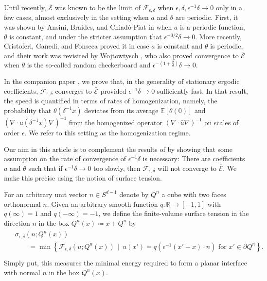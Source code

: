 \documentclass[10pt,a4paper]{amsart}
\begin{document}
Until recently, $\bar{\mathscr{E}}$ was known to be the limit of $\mathscr{F}_{\epsilon,\delta}$ when $\epsilon , \delta , \epsilon^{-1} \delta \to 0$ only in a few cases, almost exclusively in the setting when $a$ and $\theta$ are periodic.  First, it was shown by Ansini, Braides, and Chiad\`{o}-Piat in \cite{ansini_braides_chiado-piat} when $a$ is a periodic function, $\theta$ is constant, and under the stricter assumption that $\epsilon^{-3/2} \delta \to 0$.  More recently, Cristoferi, Ganedi, and Fonseca \cite{cristoferi_fonseca_ganedi_supercritical} proved it in case $a$ is constant and $\theta$ is periodic, and their work was revisited by Wojtowtysch \cite{wojtowytsch}, who also proved convergence to $ \bar{\mathscr{E}}$ when $\theta$ is the so-called random checkerboard and $ \epsilon^{ - ( 1 + \frac{ 2 }{ d } ) } \delta \to 0 $. 

In the companion paper \cite{part1}, we prove that, in the generality of stationary ergodic coefficients, $\mathscr{F}_{\epsilon,\delta}$ converges to $\bar{\mathscr{E}}$ provided $\epsilon^{-1} \delta \to 0$ sufficiently fast. In that result, the speed is quantified in terms of rates of homogenization, namely, the probability that $\theta(\delta^{-1} x)$ deviates from its average $\mathbb{E} [ \theta (0) ]$ and $( \nabla \cdot a(\delta^{-1} x) \nabla )^{-1}$ from the homogenized operator  $( \nabla \cdot \bar{a} \nabla )^{-1}$ on scales of order $ \epsilon $. We refer to this setting as the homogenization regime.

Our aim in this article is to complement the results of \cite{part1} by showing that some assumption on the rate of convergence of $\epsilon^{-1} \delta$ is necessary: There are coefficients $a$ and $\theta$  such that if $\epsilon^{-1} \delta \to 0$ too slowly, then $\mathscr{F}_{\epsilon,\delta}$ will not converge to $\bar{ \mathscr{E} }$.  We make this precise using the notion of surface tension.  

For an arbitrary unit vector $n \in S^{d-1}$ denote by $Q^{ n } $ a cube with two faces orthonormal $ n $. Given an arbitrary smooth function $ q : \mathbb{R} \to [-1,1]$ with $q(\infty) = 1$ and $q(-\infty) = -1$, we define the finite-volume surface tension in the direction $n$ in the box $ Q^{ n } ( x ) \coloneqq x + Q^{n} $ by
	\begin{align}\label{eqn:surface-tension}
	\begin{aligned}
		& \sigma_{\epsilon,\delta}( n ; Q^{n} ( x ) ) \\ &\qquad = \min \left\{ \mathscr{F}_{\epsilon,\delta}(u; Q^{n} ( x ) )\, \mid \, u(x') = q( \epsilon^{-1} ( x' - x) \cdot n ) \, \, \text{for} \, \, x' \in \partial Q^{n}\right\}. \\
	\end{aligned}
	\end{align}
Simply put, this measures the minimal energy required to form a planar interface with normal $n$ in the box $ Q^{n} ( x ) $.
\end{document}
